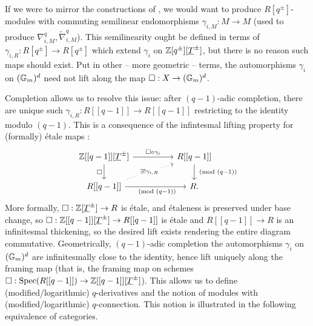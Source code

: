 If we were to mirror the constructions of , we would want to produce $R[q^{\pm}]$-modules with commuting semilinear endomorphisms $\gamma_{i,M}:M\to M$ (used to produce $\nabla^{q}_{i,M},\widetilde{\nabla}_{i,M}^{q}$). This semilinearity ought be defined in terms of $\gamma_{i,R}:R[q^{\pm}]\to R[q^{\pm}]$ which extend $\gamma_{i}$ on $\mathbb{Z}[q^{\pm}][\underline{T}^{\pm}]$, but there is no reason such maps should exist. Put in other -- more geometric -- terms, the automorphisms $\gamma_{i}$ on $(\mathbb{G}_{m})^{d}$ need not lift along the map $\square:X\to(\mathbb{G}_{m})^{d}$.

Completion allows us to resolve this issue: after $(q-1)$-adic completion, there are unique such $\gamma_{i,R}:R[[q-1]]\to R[[q-1]]$ restricting to the identity modulo $(q-1)$. This is a consequence of the infintesmal lifting property for (formally) \'{e}tale maps \cite[\href{https://stacks.math.columbia.edu/tag/00UP}{Tag 00UP}]{stacks-project}: 
$$%
\begin{tikzcd}
	{\ZZ[[q-1]][\underline{T}^{\pm}]} && {R[[q-1]]} \\
	{R[[q-1]]} && R.
	\arrow["{\square\circ\gamma_{i}}", from=1-1, to=1-3]
	\arrow["\square"', from=1-1, to=2-1]
	\arrow["{\pmod{(q-1)}}", from=1-3, to=2-3]
	\arrow["{\exists!\gamma_{i,R}}"{description}, dotted, from=2-1, to=1-3]
	\arrow["{\pmod{(q-1)}}"', from=2-1, to=2-3]
\end{tikzcd}$$
More formally, $\square:\mathbb{Z}[\underline{T}^{\pm}]\to R$ is \'{e}tale, and \'{e}taleness is preserved under base change, so $\square:\mathbb{Z}[[q-1]][\underline{T}^{\pm}]\to R[[q-1]]$ is \'{e}tale and $R[[q-1]]\to R$ is an infinitesmal thickening, so the desired lift exists rendering the entire diagram commutative. Geometrically, $(q-1)$-adic completion the automorphisms $\gamma_{i}$ on $(\mathbb{G}_{m})^{d}$ are infinitesmally close to the identity, hence lift uniquely along the framing map (that is, the framing map on schemes $\square:\operatorname{Spec}(R[[q-1]])\to\mathbb{Z}[[q-1]][\underline{T}^{\pm}]$). This allows us to define (modified/logarithmic) $q$-derivatives and the notion of modules with (modified/logarithmic) $q$-connection. This notion is illustrated in the following equivalence of categories. 

